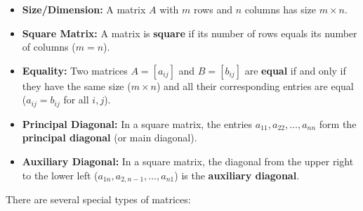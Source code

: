 \documentclass[oneside]{book}
\begin{document}
\begin{itemize}
    \item \textbf{Size/Dimension:} A matrix $A$ with $m$ rows and $n$ columns has size $m \times n$.
    \item \textbf{Square Matrix:} A matrix is \textbf{square} if its number of rows equals its number of columns ($m=n$).
    \item \textbf{Equality:} Two matrices $A = [a_{ij}]$ and $B = [b_{ij}]$ are \textbf{equal} if and only if they have the same size ($m \times n$) and all their corresponding entries are equal ($a_{ij} = b_{ij}$ for all $i, j$).
    \item \textbf{Principal Diagonal:} In a square matrix, the entries $a_{11}, a_{22}, \ldots, a_{nn}$ form the \textbf{principal diagonal} (or main diagonal).
    \item \textbf{Auxiliary Diagonal:} In a square matrix, the diagonal from the upper right to the lower left ($a_{1n}, a_{2,n-1}, \ldots, a_{n1}$) is the \textbf{auxiliary diagonal}.
\end{itemize}

There are several special types of matrices:

% 
\end{document}
